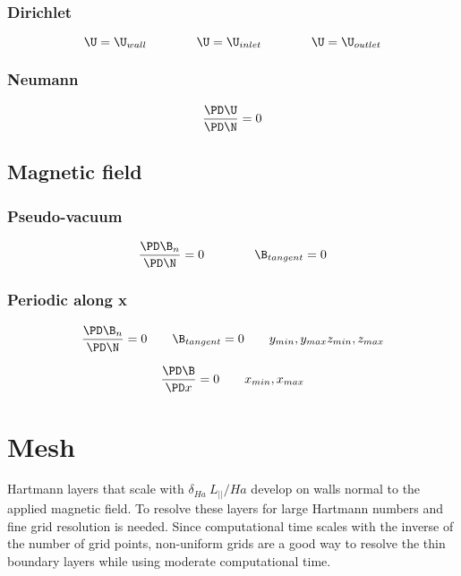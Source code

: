 \documentclass[11pt]{article}
\begin{document}
\subsubsection{Dirichlet}

\begin{equation}
	\U = \U_{wall}
	\qquad \qquad
	\U = \U_{inlet}
	\qquad \qquad
	\U = \U_{outlet}
\end{equation}

\subsubsection{Neumann}
\begin{equation}
	\frac{\PD \U}{\PD \N} = 0
\end{equation}

\subsection{Magnetic field}
\subsubsection{Pseudo-vacuum}
\begin{equation}
	\frac{\PD \B_{n}}{\PD \N} = 0
	\qquad \qquad
	\B_{tangent} = 0
\end{equation}

\subsubsection{Periodic along x}
\begin{equation}
	\frac{\PD \B_{n}}{\PD \N} = 0
	\qquad
	\B_{tangent} = 0
	\qquad
	y_{min},y_{max}
	z_{min},z_{max}
\end{equation}

\begin{equation}
	\frac{\PD \B}{\PD x} = 0
	\qquad
	x_{min},x_{max}
\end{equation}

\section{Mesh}
Hartmann layers that scale with $\delta_{Ha}~L_{||}/Ha$ develop on walls normal to the applied magnetic field. To resolve these layers for large Hartmann numbers and fine grid resolution is needed. Since computational time scales with the inverse of the number of grid points, non-uniform grids are a good way to resolve the thin boundary layers while using moderate computational time.
\end{document}
